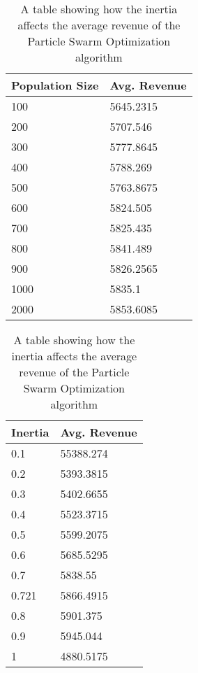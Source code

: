 \documentclass{article}
\begin{document}
\begin{table}[h]
\begin{minipage}[b]{0.45\linewidth}
\centering
\begin{tabular}{@{}ll@{}}
\toprule
Population Size   & Avg. Revenue      \\ \midrule
100               & 5645.2315         \\
200               & 5707.546          \\
300               & 5777.8645         \\
400               & 5788.269          \\
500               & 5763.8675         \\
600               & 5824.505          \\
700               & 5825.435          \\
800               & 5841.489          \\
900               & 5826.2565         \\
1000              & 5835.1            \\
2000              & 5853.6085         \\ \bottomrule
\end{tabular}
\caption{A table showing how the population size affects the average revenue of the Particle Swarm Optimization algorithm}
\label{PSO-Population-Size}
\end{minipage}
\hfill
\begin{minipage}[b]{0.45\linewidth}
\centering
\begin{tabular}{@{}ll@{}}
\toprule
Inertia         & Avg. Revenue     \\ \midrule
0.1             & 55388.274        \\
0.2             & 5393.3815        \\
0.3             & 5402.6655        \\
0.4             & 5523.3715        \\
0.5             & 5599.2075        \\
0.6             & 5685.5295        \\
0.7             & 5838.55          \\
0.721           & 5866.4915        \\
0.8             & 5901.375         \\
0.9             & 5945.044         \\
1               & 4880.5175        \\ \bottomrule
\end{tabular}
\caption{A table showing how the inertia affects the average revenue of the Particle Swarm Optimization algorithm}
\label{PSO-Inertia}
\end{minipage}
\end{table}
\end{document}
